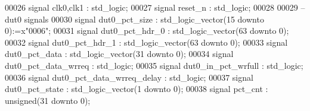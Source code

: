 \begin{DoxyCode}
00026 \textcolor{keywordflow}{signal} \textcolor{vhdlchar}{clk0}\textcolor{vhdlchar}{,}\textcolor{vhdlchar}{clk1}        \textcolor{vhdlchar}{:} \textcolor{comment}{std\_logic};
00027 \textcolor{keywordflow}{signal} \textcolor{vhdlchar}{reset_n}       \textcolor{vhdlchar}{:} \textcolor{comment}{std\_logic}; 
00028    
00029 \textcolor{keyword}{   --dut0 signals}
00030 \textcolor{keywordflow}{signal} \textcolor{vhdlchar}{dut0_pct_size}          \textcolor{vhdlchar}{:} \textcolor{comment}{std\_logic\_vector}\textcolor{vhdlchar}{(}\textcolor{vhdllogic}{}\textcolor{vhdllogic}{15} \textcolor{keywordflow}{downto} \textcolor{vhdllogic}{}\textcolor{vhdllogic}{0}\textcolor{vhdlchar}{)}\textcolor{vhdlchar}{:=}\textcolor{vhdlchar}{x}\textcolor{vhdllogic}{"0006"};
00031 \textcolor{keywordflow}{signal} \textcolor{vhdlchar}{dut0_pct_hdr_0}         \textcolor{vhdlchar}{:} \textcolor{comment}{std\_logic\_vector}\textcolor{vhdlchar}{(}\textcolor{vhdllogic}{}\textcolor{vhdllogic}{63} \textcolor{keywordflow}{downto} \textcolor{vhdllogic}{}\textcolor{vhdllogic}{0}\textcolor{vhdlchar}{)};
00032 \textcolor{keywordflow}{signal} \textcolor{vhdlchar}{dut0_pct_hdr_1}         \textcolor{vhdlchar}{:} \textcolor{comment}{std\_logic\_vector}\textcolor{vhdlchar}{(}\textcolor{vhdllogic}{}\textcolor{vhdllogic}{63} \textcolor{keywordflow}{downto} \textcolor{vhdllogic}{}\textcolor{vhdllogic}{0}\textcolor{vhdlchar}{)};
00033 \textcolor{keywordflow}{signal} \textcolor{vhdlchar}{dut0_pct_data}          \textcolor{vhdlchar}{:} \textcolor{comment}{std\_logic\_vector}\textcolor{vhdlchar}{(}\textcolor{vhdllogic}{}\textcolor{vhdllogic}{31} \textcolor{keywordflow}{downto} \textcolor{vhdllogic}{}\textcolor{vhdllogic}{0}\textcolor{vhdlchar}{)};
00034 \textcolor{keywordflow}{signal} \textcolor{vhdlchar}{dut0_pct_data_wrreq}    \textcolor{vhdlchar}{:} \textcolor{comment}{std\_logic};
00035 \textcolor{keywordflow}{signal} \textcolor{vhdlchar}{dut0_in_pct_wrfull}     \textcolor{vhdlchar}{:} \textcolor{comment}{std\_logic};
00036 \textcolor{keywordflow}{signal} \textcolor{vhdlchar}{dut0_pct_data_wrreq_delay} \textcolor{vhdlchar}{:} \textcolor{comment}{std\_logic};
00037 \textcolor{keywordflow}{signal} \textcolor{vhdlchar}{dut0_pct_state}         \textcolor{vhdlchar}{:} \textcolor{comment}{std\_logic\_vector}\textcolor{vhdlchar}{(}\textcolor{vhdllogic}{}\textcolor{vhdllogic}{1} \textcolor{keywordflow}{downto} \textcolor{vhdllogic}{}\textcolor{vhdllogic}{0}\textcolor{vhdlchar}{)};
00038 \textcolor{keywordflow}{signal} \textcolor{vhdlchar}{pct_cnt}                \textcolor{vhdlchar}{:} \textcolor{comment}{unsigned}\textcolor{vhdlchar}{(}\textcolor{vhdllogic}{}\textcolor{vhdllogic}{31} \textcolor{keywordflow}{downto} \textcolor{vhdllogic}{}\textcolor{vhdllogic}{0}\textcolor{vhdlchar}{)};

\end{DoxyCode}
